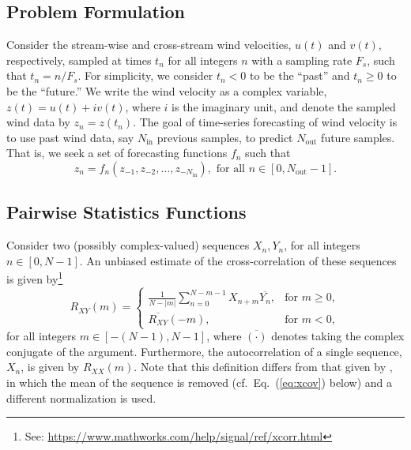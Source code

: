 \documentclass[11pt, oneside]{article}
\newcommand{\eqnref}[1]{Eq.~(\ref{#1})}
\begin{document}
\subsection{Problem Formulation}
Consider the stream-wise and cross-stream wind velocities, $u(t)$ and $v(t)$, respectively, sampled at times $t_n$ for all integers $n$ with a sampling rate $F_s$, such that $t_n = n/F_s$.
For simplicity, we consider $t_n < 0$ to be the ``past'' and $t_n \geq 0$ to be the ``future.''
We write the wind velocity as a complex variable, $z(t) = u(t) + i v(t)$, where $i$ is the imaginary unit, and denote the sampled wind data by $z_n = z(t_n)$.
The goal of time-series forecasting of wind velocity is to use past wind data, say $N_\text{in}$ previous samples, to predict $N_\text{out}$ future samples.
That is, we seek a set of forecasting functions $f_n$ such that
\begin{equation}
z_n = f_n (z_{-1}, z_{-2}, \dots, z_{-N_\text{in}} ), \text{ for all } n \in [0, N_\text{out} - 1].
\end{equation}

\subsection{Pairwise Statistics Functions}
Consider two (possibly complex-valued) sequences $X_n,Y_n$, for all integers $n \in [0,N-1]$.
An unbiased estimate of the cross-correlation of these sequences is given by\footnote{See: \url{https://www.mathworks.com/help/signal/ref/xcorr.html}}
\begin{equation}\label{eq:xcorr}
R_{XY}(m) =
\begin{cases}
\displaystyle \frac{1}{N - |m|} \sum_{n=0}^{N-m-1} X_{n+m} \overline{Y_n}, & \text{for } m \geq 0,\\[20pt]
\overline{R_{XY}}(-m), & \text{for } m < 0,
\end{cases}
\end{equation}
for all integers $m \in [-(N-1),N-1]$, where $\overline{(\cdot)}$ denotes taking the complex conjugate of the argument.
Furthermore, the autocorrelation of a single sequence, $X_n$, is given by $R_{XX}(m)$.
Note that this definition differs from that given by \citet[Sec.~8.2.1]{Stull1988}, in which the mean of the sequence is removed (cf.~\eqnref{eq:xcov} below) and a different normalization is used.
\end{document}
